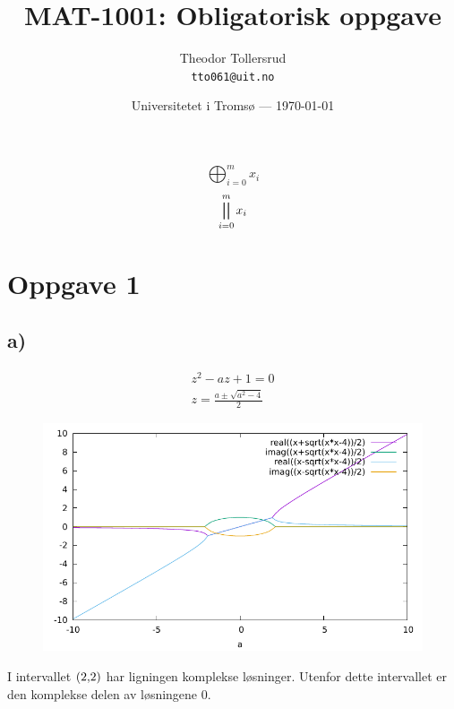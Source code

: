 \documentclass{article}
\title{MAT-1001: Obligatorisk oppgave} %
\author{Theodor Tollersrud\\ \texttt{tto061@uit.no}} %
\date{Universitetet i Tromsø --- \today} %
\begin{document}
\maketitle %

$$\bigoplus_{i=0}^{m} x_i$$
$$\bigparallel_{i=0}^{m} x_i$$

\section*{Oppgave 1} %
\subsection*{a)}
\begin{align*}
	z^2 - az + 1 = 0\\
	z = \frac{a \pm \sqrt{a^2 - 4}}{2}
\end{align*}
\begin{figure}[H]
	\includegraphics[width=\textwidth]{output.pdf}
\end{figure}
I intervallet $\interval({2, 2})$ har ligningen komplekse løsninger. Utenfor dette intervallet er den komplekse delen av løsningene 0. 


\end{document}
